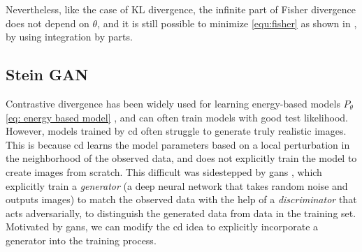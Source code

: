 \documentclass[12pt,paper=letter]{scrreprt}
\begin{document}
Nevertheless, like the case of KL divergence,
the infinite part of Fisher divergence does not depend on $\theta$, and it is still possible to minimize \eqref{equ:fisher} as shown in \citet{hyvarinen2005estimation}, by using integration by parts. %
\fi 






\subsection{Stein GAN}
\label{sec:steingan}

Contrastive divergence has been widely used for learning energy-based models $P_\theta$ \eqref{eq: energy based model} , and can often train models with good test likelihood. 
However, models trained by \ac{cd} often struggle to generate truly realistic images.
This is because \ac{cd} learns the model parameters based on a local perturbation in the neighborhood of the observed data, 
and does not explicitly train the model to create images from scratch. 
This difficult was sidestepped by \acp{gan} \citep{goodfellow2014generative}, 
which explicitly train a \emph{generator} (a deep neural network that takes random noise and outputs
images) to match the observed data with the help of a \emph{discriminator} that acts adversarially, to distinguish the generated data from data in the training set. 
Motivated by \acp{gan}, we can modify the \ac{cd} idea to explicitly incorporate a generator into the training process. 
\end{document}
